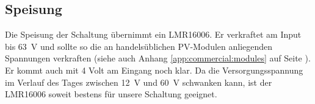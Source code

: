 {\begin{a3pages}
{\begin{minipage}{135mm}
{\begin{minipage}{0.475\textwidth}
        \end{minipage}}
    \end{minipage}}
    \hspace*{15mm}
\end{a3pages}}


\subsection{Speisung}
\label{subsec:hw:sensor:supply}

Die  Speisung  der  Schaltung   \"ubernimmt  ein  LMR16006. Er  verkraftet  am
Input   bis   \SI{63}{\volt}   und   sollte   so   die  an   handels\"ublichen
PV-Modulen    anliegenden   Spannungen    verkraften   (siehe    auch   Anhang
\ref{app:commercial:modules} auf  Seite \pageref{app:commercial:modules}).  Er
kommt auch  mit 4  Volt am  Eingang noch  klar. Da die  Versorgungsspannung im
Verlauf des  Tages zwischen \SI{12}{\volt} und  \SI{60}{\volt} schwanken kann,
ist der LMR16006 soweit bestens f\"ur unsere Schaltung geeignet.

